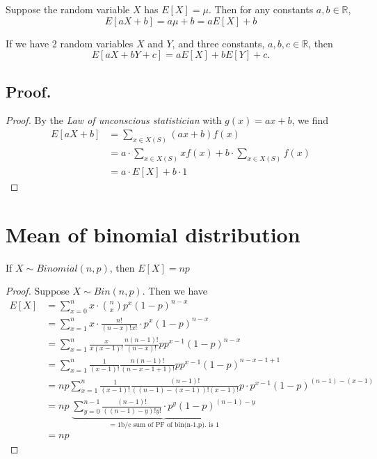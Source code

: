 \documentclass[
]{book}
\theoremstyle{definition}
\theoremstyle{definition}
\theoremstyle{definition}
\theoremstyle{definition}
\theoremstyle{remark}
\begin{document}
Suppose the random variable \(X\) has \(E[X]=\mu\). Then for any constants \(a,b\in\mathbb{R}\),
\[ E[aX+b]= a \mu + b = a E[X]+b\]

If we have 2 random variables \(X\) and \(Y\), and three constants, \(a,b,c\in \mathbb{R}\), then
\[
  E[aX+bY + c] = aE[X] + bE[Y] +c.
\]

\hypertarget{proof.}{%
\subsection{Proof.}\label{proof.}}

\begin{proof}
By the \emph{Law of unconscious statistician} with \(g(x)=ax+b\), we find
\begin{align*}
E[aX+b] &=\sum_{x\in X(S)} (ax+b) f(x)\\
& = a \cdot  \sum_{x\in X(S)} x f(x) + b  \cdot \sum_{x\in X(S)} f(x) \\
&= a\cdot  E[X]  + b \cdot 1
\end{align*}
\end{proof}

\hypertarget{mean-of-binomial-distribution}{%
\section{Mean of binomial distribution}\label{mean-of-binomial-distribution}}

If \(X \sim Binomial(n,p)\), then \(E[X] = np\)

\begin{proof}
Suppose \(X \sim Bin(n,p)\). Then we have
\begin{align*}
E[X] &= \sum_{x=0}^n x\cdot \binom{n}{x}  p^x (1-p)^{n-x}\\
&= \sum_{x=1}^n x\cdot \frac{n!}{(n-x)!x!} \cdot p^x (1-p)^{n-x}\\
&= \sum_{x=1}^n \frac{x}{x(x-1)!} \frac{n(n-1)!}{(n-x)!} p p^{x-1} (1-p)^{n-x}\\
&= \sum_{x=1}^n \frac{1}{(x-1)!}\frac{n(n-1)!}{(n-x-1+1)!} p p^{x-1} (1-p)^{n-x-1+1}\\
&= np \sum_{x=1}^n \frac{1}{(x-1)!}\frac{(n-1)!}{((n-1)-(x-1))! (x-1)!} p\cdot p^{x-1} (1-p)^{(n-1)-(x-1)}\\
&= np \; \underbrace{\sum_{y=0}^{n-1} \frac{(n-1)!}{((n-1)-y)! y!} \cdot p^{y} (1-p)^{(n-1)-y}}_{=1\text{b/c sum of PF of bin(n-1,p). is 1}}\\
&= np
\end{align*}
\end{proof}
\end{document}
